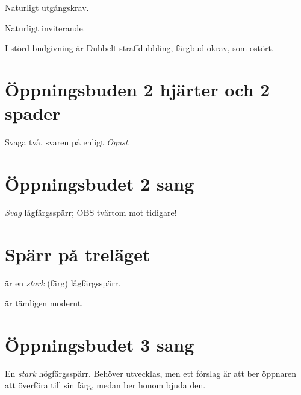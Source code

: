 \item[--\ru{3}] Naturligt utgångskrav.
\item[--\ho{3}, \kl{4}] Naturligt inviterande.
\ebe

I störd budgivning
är Dubbelt straffdubbling, färgbud okrav,  som ostört.

\section{\"Oppningsbuden 2 hjärter och 2 spader}

Svaga två, svaren på  enligt \emph{Ogust}.

\section{\"Oppningsbudet 2 sang}

\emph{Svag} lågfärgsspärr; OBS tvärtom mot tidigare!

\section{Spärr på treläget}

\bbe
\item[\la{3}] är en \emph{stark} (färg) lågfärgsspärr.
\item[\ho{3}] är tämligen modernt.
\ebe
\section{\"Oppningsbudet 3 sang}

En \emph{stark} högfärgsspärr. Behöver utvecklas, men ett förslag är att
 ber öppnaren att överföra till sin färg, medan  ber honom
bjuda den.

